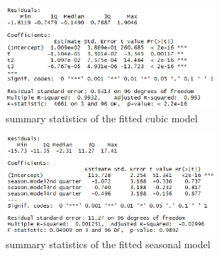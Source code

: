 \documentclass[11pt,a4paper]{article}
\begin{document}
\begin{figure} [htb!]
    \centering
    \includegraphics[width=0.7\textwidth]{summary_cubicmodel}
    \caption{summary statistics of the fitted cubic model}
    \label{fig:summary_cubicmodel}
\end{figure}

\begin{figure}
    \centering
    \includegraphics[width=0.7\textwidth]{summary_seasonmodel}
    \caption{summary statistics of the fitted seasonal model}
    \label{fig:summary_seasonmodel}
\end{figure}
\end{document}
